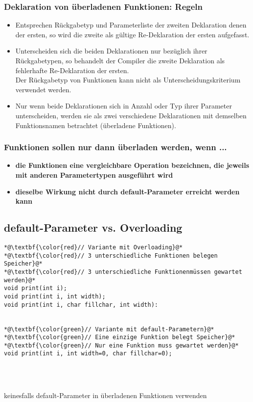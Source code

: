 \subsubsection{Deklaration von überladenen Funktionen: Regeln\hfill}
\label{sec:unterunterabschnitt}
\begin{itemize}
	\item Entsprechen Rückgabetyp und Parameterliste der zweiten Deklaration denen der ersten, so wird die zweite als gültige Re-Deklaration der ersten aufgefasst.
	\item Unterscheiden sich die beiden Deklarationen nur bezüglich ihrer Rückgabetypen, so behandelt der Compiler die zweite Deklaration als fehlerhafte Re-Deklaration der ersten.
		\\ Der Rückgabetyp von Funktionen kann nicht als Unterscheidungskriterium verwendet werden.
	\item Nur wenn beide Deklarationen sich in Anzahl oder Typ ihrer Parameter unterscheiden, werden sie als zwei verschiedene Deklarationen mit demselben Funktionsnamen betrachtet (überladene Funktionen).
\end{itemize}

\subsubsection{Funktionen sollen nur dann überladen werden, wenn ...\hfill}
\label{sec:unterunterabschnitt}
\begin{itemize}
	\item \textbf{die Funktionen eine vergleichbare Operation bezeichnen, die jeweils mit anderen Parametertypen ausgeführt wird}
	\item \textbf{dieselbe Wirkung nicht durch default-Parameter erreicht werden kann}
\end{itemize}


\subsection{default-Parameter vs. Overloading\hfill}
\label{sec:unterabschnitt}
\noindent
\begin{minipage}{\linewidth}
\begin{lstlisting}
*@\textbf{\color{red}// Variante mit Overloading}@*
*@\textbf{\color{red}// 3 unterschiedliche Funktionen belegen Speicher}@*
*@\textbf{\color{red}// 3 unterschiedliche Funktionenmüssen gewartet werden}@*
void print(int i);
void print(int i, int width);
void print(int i, char fillchar, int width):
	
	
*@\textbf{\color{green}// Variante mit default-Parametern}@*
*@\textbf{\color{green}// Eine einzige Funktion belegt Speicher}@*
*@\textbf{\color{green}// Nur eine Funktion muss gewartet werden}@*
void print(int i, int width=0, char fillchar=0);	
\end{lstlisting}
\end{minipage}
\\
\\
\begin{achtung}
keinesfalls default-Parameter in überladenen Funktionen verwenden
\end{achtung}


 